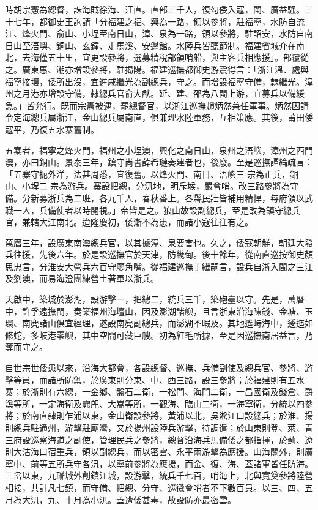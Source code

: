 時胡宗憲為總督，誅海賊徐海、汪直。直部三千人，復勾倭入寇，閩、廣益騷。三十七年，都御史王詢請「分福建之福、興為一路，領以參將，駐福寧，水防自流江、烽火門、俞山、小埕至南日山，漳、泉為一路，領以參將，駐詔安，水防自南日山至浯嶼、銅山、玄鐘、走馬溪、安邊館。水陸兵皆聽節制。福建省城介在南北，去海僅五十里，宜更設參將，選募精稅部領哨船，與主客兵相應援」。部覆從之。廣東惠、潮亦增設參將，駐揭陽。福建巡撫都御史游震得言：「浙江溫、處與福寧接壤，倭所出沒，宜進戚繼光為副總兵，守之。而增設福寧守備，隸繼光。漳州之月港亦增設守備，隸總兵官俞大猷。延、建、邵為八閩上游，宜募兵以備緩急。」皆允行。既而宗憲被逮，罷總督官，以浙江巡撫趙炳然兼任軍事。炳然因請令定海總兵屬浙江，金山總兵屬南直，俱兼理水陸軍務，互相策應。其後，莆田倭寇平，乃復五水寨舊制。

五寨者，福寧之烽火門，福州之小埕澳，興化之南日山，泉州之浯嶼，漳州之西門澳，亦曰銅山。景泰三年，鎮守尚書薛希璉奏建者也，後廢。至是巡撫譚綸疏言：「五寨守扼外洋，法甚周悉，宜復舊。以烽火門、南日、浯嶼三宗為正兵，銅山、小埕二宗為游兵。寨設把總，分汛地，明斥堠，嚴會哨。改三路參將為守備。分新募浙兵為二班，各九千人，春秋番上。各縣民壯皆補用精悍，每府領以武職一人，兵備使者以時閱視。」帝皆是之。狼山故設副總兵，至是改為鎮守總兵官，兼轄大江南北。迨隆慶初，倭漸不為患，而諸小寇往往有之。

萬曆三年，設廣東南澳總兵官，以其據漳、泉要害也。久之，倭寇朝鮮，朝廷大發兵往援，先後六年。於是設巡撫官於天津，防畿甸。後十餘年，從南直巡按御史顏思忠言，分淮安大營兵六百守廖角嘴。從福建巡撫丁繼嗣言，設兵自浙入閩之三江及劉澳，而易海澄團練營土著軍以浙兵。

天啟中，築城於澎湖，設游擊一，把總二，統兵三千，築砲臺以守。先是，萬曆中，許孚遠撫閩，奏築福州海壇山，因及澎湖諸嶼，且言浙東沿海陳錢、金塘、玉環、南麂諸山俱宜經理，遂設南麂副總兵，而澎湖不暇及。其地遙峙海中，逶迤如修蛇，多岐港零嶼，其中空間可藏巨艘。初為紅毛所據，至是因巡撫南居益言，乃奪而守之。

自世宗世倭患以來，沿海大都會，各設總督、巡撫、兵備副使及總兵官、參將、游擊等員，而諸所防禦，於廣東則分東、中、西三路，設三參將；於福建則有五水寨；於浙則有六總，一金鄉、盤石二衛，一松門、海門二衛，一昌國衛及錢倉、爵溪等所，一定海衛及霩戺、大嵩等所，一觀海、臨山二衛，一海寧衛，分統以四參將；於南直隸則乍浦以東，金山衛設參將，黃浦以北，吳淞江口設總兵；於淮、揚則總兵駐通州，游擊駐廟灣，又於揚州設陸兵游擊，待調遣；於山東則登、萊、青三府設巡察海道之副使，管理民兵之參將，總督沿海兵馬備倭之都指揮，於薊、遼則大沽海口宿重兵，領以副總兵，而以密雲、永平兩游擊為應援。山海關外，則廣寧中、前等五所兵守各汛，以寧前參將為應援，而金、復、海、蓋諸軍皆任防海。三岔以東，九聯城外創鎮江城，設游擊，統兵千七百，哨海上，北與寬奠參將陸營相接，共計凡七鎮，而守備、把總、分守、巡徼會哨者不下數百員。以三、四、五月為大汛，九、十月為小汛。蓋遭倭甚毒，故設防亦最密雲。

